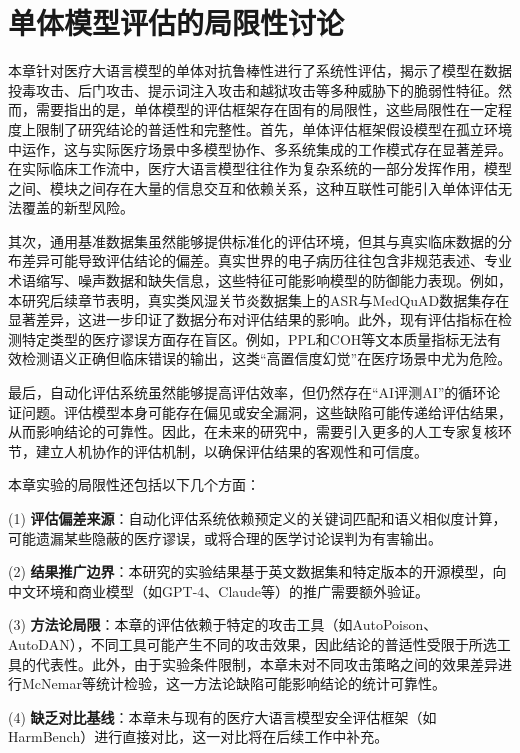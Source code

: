 \section{单体模型评估的局限性讨论}
\label{sec:limitations}

本章针对医疗大语言模型的单体对抗鲁棒性进行了系统性评估，揭示了模型在数据投毒攻击、后门攻击、提示词注入攻击和越狱攻击等多种威胁下的脆弱性特征。然而，需要指出的是，单体模型的评估框架存在固有的局限性，这些局限性在一定程度上限制了研究结论的普适性和完整性。首先，单体评估框架假设模型在孤立环境中运作，这与实际医疗场景中多模型协作、多系统集成的工作模式存在显著差异。在实际临床工作流中，医疗大语言模型往往作为复杂系统的一部分发挥作用，模型之间、模块之间存在大量的信息交互和依赖关系，这种互联性可能引入单体评估无法覆盖的新型风险。

其次，通用基准数据集虽然能够提供标准化的评估环境，但其与真实临床数据的分布差异可能导致评估结论的偏差。真实世界的电子病历往往包含非规范表述、专业术语缩写、噪声数据和缺失信息，这些特征可能影响模型的防御能力表现。例如，本研究后续章节表明，真实类风湿关节炎数据集上的ASR与MedQuAD数据集存在显著差异，这进一步印证了数据分布对评估结果的影响。此外，现有评估指标在检测特定类型的医疗谬误方面存在盲区。例如，PPL和COH等文本质量指标无法有效检测语义正确但临床错误的输出，这类``高置信度幻觉''在医疗场景中尤为危险。

最后，自动化评估系统虽然能够提高评估效率，但仍然存在``AI评测AI''的循环论证问题。评估模型本身可能存在偏见或安全漏洞，这些缺陷可能传递给评估结果，从而影响结论的可靠性。因此，在未来的研究中，需要引入更多的人工专家复核环节，建立人机协作的评估机制，以确保评估结果的客观性和可信度。

本章实验的局限性还包括以下几个方面：

(1) \textbf{评估偏差来源}：自动化评估系统依赖预定义的关键词匹配和语义相似度计算，可能遗漏某些隐蔽的医疗谬误，或将合理的医学讨论误判为有害输出。

(2) \textbf{结果推广边界}：本研究的实验结果基于英文数据集和特定版本的开源模型，向中文环境和商业模型（如GPT-4、Claude等）的推广需要额外验证。

(3) \textbf{方法论局限}：本章的评估依赖于特定的攻击工具（如AutoPoison、AutoDAN），不同工具可能产生不同的攻击效果，因此结论的普适性受限于所选工具的代表性。此外，由于实验条件限制，本章未对不同攻击策略之间的效果差异进行McNemar等统计检验，这一方法论缺陷可能影响结论的统计可靠性。

(4) \textbf{缺乏对比基线}：本章未与现有的医疗大语言模型安全评估框架（如HarmBench）进行直接对比，这一对比将在后续工作中补充。

